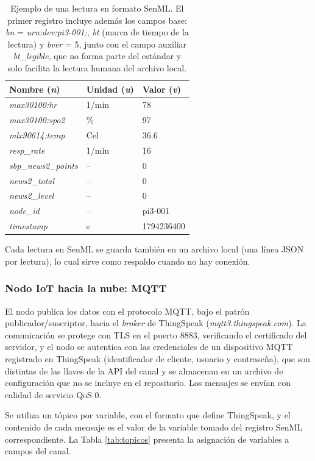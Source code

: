 \documentclass[11pt,a4paper]{article}
\begin{document}
\begin{table}[H]
\centering
\small
\begin{tabular}{l l l}
\toprule
\textbf{Nombre (\textit{n})} & \textbf{Unidad (\textit{u})} & \textbf{Valor (\textit{v})} \\
\midrule
\textit{max30100:hr} & 1/min & 78 \\
\textit{max30100:spo2} & \% & 97 \\
\textit{mlx90614:temp} & Cel & 36.6 \\
\textit{resp\_rate} & 1/min & 16 \\
\textit{sbp\_news2\_points} & -- & 0 \\
\textit{news2\_total} & -- & 0 \\
\textit{news2\_level} & -- & 0 \\
\textit{node\_id} & -- & pi3-001 \\
\textit{timestamp} & s & 1794236400 \\
\bottomrule
\end{tabular}
\caption{Ejemplo de una lectura en formato SenML. El primer registro incluye además los campos base: \textit{bn} = \textit{urn:dev:pi3-001:}, \textit{bt} (marca de tiempo de la lectura) y \textit{bver} = 5, junto con el campo auxiliar \textit{bt\_legible}, que no forma parte del estándar y solo facilita la lectura humana del archivo local.}
\label{tab:senml}
\end{table}

Cada lectura en SenML se guarda también en un archivo local (una línea JSON por lectura), lo cual sirve como respaldo cuando no hay conexión.

\subsubsection{Nodo IoT hacia la nube: MQTT}

El nodo publica los datos con el protocolo MQTT, bajo el patrón publicador/suscriptor, hacia el \textit{broker} de ThingSpeak (\textit{mqtt3.thingspeak.com}). La comunicación se protege con TLS en el puerto 8883, verificando el certificado del servidor, y el nodo se autentica con las credenciales de un dispositivo MQTT registrado en ThingSpeak (identificador de cliente, usuario y contraseña), que son distintas de las llaves de la API del canal y se almacenan en un archivo de configuración que no se incluye en el repositorio. Los mensajes se envían con calidad de servicio QoS 0.

Se utiliza un tópico por variable, con el formato que define ThingSpeak, y el contenido de cada mensaje es el valor de la variable tomado del registro SenML correspondiente. La Tabla \ref{tab:topicos} presenta la asignación de variables a campos del canal.
\end{document}
